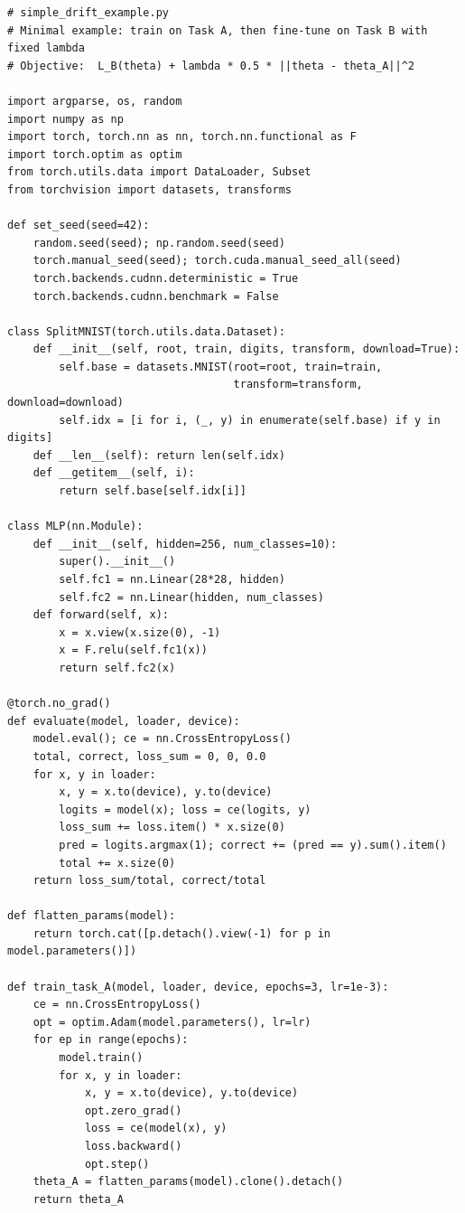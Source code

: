 \documentclass[9pt,a4paper]{extarticle}
\begin{document}
\begin{lstlisting}
# simple_drift_example.py
# Minimal example: train on Task A, then fine-tune on Task B with fixed lambda
# Objective:  L_B(theta) + lambda * 0.5 * ||theta - theta_A||^2

import argparse, os, random
import numpy as np
import torch, torch.nn as nn, torch.nn.functional as F
import torch.optim as optim
from torch.utils.data import DataLoader, Subset
from torchvision import datasets, transforms

def set_seed(seed=42):
    random.seed(seed); np.random.seed(seed)
    torch.manual_seed(seed); torch.cuda.manual_seed_all(seed)
    torch.backends.cudnn.deterministic = True
    torch.backends.cudnn.benchmark = False

class SplitMNIST(torch.utils.data.Dataset):
    def __init__(self, root, train, digits, transform, download=True):
        self.base = datasets.MNIST(root=root, train=train,
                                   transform=transform, download=download)
        self.idx = [i for i, (_, y) in enumerate(self.base) if y in digits]
    def __len__(self): return len(self.idx)
    def __getitem__(self, i):
        return self.base[self.idx[i]]

class MLP(nn.Module):
    def __init__(self, hidden=256, num_classes=10):
        super().__init__()
        self.fc1 = nn.Linear(28*28, hidden)
        self.fc2 = nn.Linear(hidden, num_classes)
    def forward(self, x):
        x = x.view(x.size(0), -1)
        x = F.relu(self.fc1(x))
        return self.fc2(x)

@torch.no_grad()
def evaluate(model, loader, device):
    model.eval(); ce = nn.CrossEntropyLoss()
    total, correct, loss_sum = 0, 0, 0.0
    for x, y in loader:
        x, y = x.to(device), y.to(device)
        logits = model(x); loss = ce(logits, y)
        loss_sum += loss.item() * x.size(0)
        pred = logits.argmax(1); correct += (pred == y).sum().item()
        total += x.size(0)
    return loss_sum/total, correct/total

def flatten_params(model):
    return torch.cat([p.detach().view(-1) for p in model.parameters()])

def train_task_A(model, loader, device, epochs=3, lr=1e-3):
    ce = nn.CrossEntropyLoss()
    opt = optim.Adam(model.parameters(), lr=lr)
    for ep in range(epochs):
        model.train()
        for x, y in loader:
            x, y = x.to(device), y.to(device)
            opt.zero_grad()
            loss = ce(model(x), y)
            loss.backward()
            opt.step()
    theta_A = flatten_params(model).clone().detach()
    return theta_A


\end{lstlisting}
\end{document}
